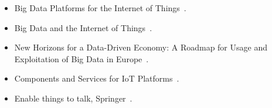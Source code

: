 \documentclass{pre-tfg}
\begin{document}
\begin{itemize}
  \item Big Data Platforms for the Internet of Things~\cite{Ciobanu2014}.
  \item Big Data and the Internet of Things~\cite{Shah2016}.
  \item New Horizons for a Data-Driven Economy: A Roadmap for Usage and Exploitation of Big Data in Europe~\cite{Strohbach2016}.
  \item Components and Services for IoT Platforms~\cite{CaSfIotPlatforms17}.
  \item Enable things to talk, Springer~\cite{EIoT2Talk13}.
\end{itemize}



\end{document}
